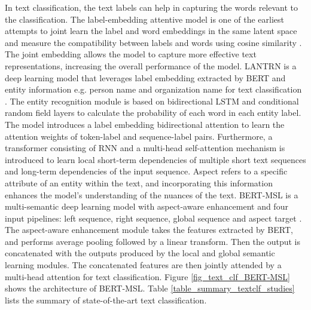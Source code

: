 \documentclass[preprint,12pt]{elsarticle}
\begin{document}
In text classification, the text labels can help in capturing the words relevant to the classification. The label-embedding attentive model is one of the earliest attempts to joint learn the label and word embeddings in the same latent space and measure the compatibility between labels and words using cosine similarity \citep{wang_joint_2018}. The joint embedding allows the model to capture more effective text representations, increasing the overall performance of the model. LANTRN is a deep learning model that leverages label embedding extracted by BERT and entity information e.g. person name and organization name for text classification \citep{yan_r-transformer_bilstm_2023}. The entity recognition module is based on bidirectional LSTM and conditional random field layers to calculate the probability of each word in each entity label. The model introduces a label embedding bidirectional attention to learn the attention weights of token-label and sequence-label pairs. Furthermore, a transformer consisting of RNN and a multi-head self-attention mechanism is introduced to learn local short-term dependencies of multiple short text sequences and long-term dependencies of the input sequence. Aspect refers to a specific attribute of an entity within the text, and incorporating this information enhances the model’s understanding of the nuances of the text. BERT-MSL is a multi-semantic deep learning model with aspect-aware enhancement and four input pipelines: left sequence, right sequence, global sequence and aspect target \citep{zhu_bert-based_2023}. The aspect-aware enhancement module takes the features extracted by BERT, and performs average pooling followed by a linear transform. Then the output is concatenated with the outputs produced by the local and global semantic learning modules. The concatenated features are then jointly attended by a multi-head attention for text classification. Figure \ref{fig_text_clf_BERT-MSL} shows the architecture of BERT-MSL. Table \ref{table_summary_textclf_studies} lists the summary of state-of-the-art text classification.
\end{document}
